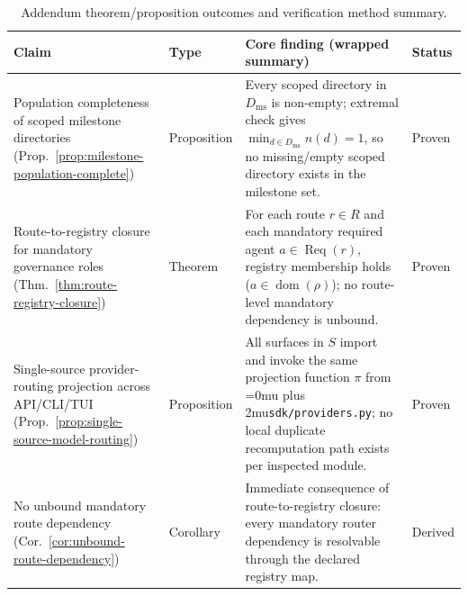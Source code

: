 \documentclass[12pt]{article}
\theoremstyle{definition}
\DeclareRobustCommand{\code}[1]{\begingroup\Urlmuskip=0mu plus 2mu\relax\nolinkurl{#1}\endgroup}
\begin{document}
\begin{table}[H]
\centering
\caption{Addendum theorem/proposition outcomes and verification method summary.}
\label{tab:addendum-results-summary}
\begin{tabularx}{\linewidth}{@{}>{\RaggedRight\arraybackslash}p{3.8cm}>{\RaggedRight\arraybackslash}p{2.8cm}>{\RaggedRight\arraybackslash}X>{\RaggedRight\arraybackslash}p{2.0cm}@{}}
\toprule
\textbf{Claim} & \textbf{Type} & \textbf{Core finding (wrapped summary)} & \textbf{Status} \\
\midrule
Population completeness of scoped milestone directories (Prop.~\ref{prop:milestone-population-complete})
& Proposition
& Every scoped directory in $D_{\mathrm{ms}}$ is non-empty; extremal check gives $\min_{d\in D_{\mathrm{ms}}} n(d)=1$, so no missing/empty scoped directory exists in the milestone set.
& Proven \\
Route-to-registry closure for mandatory governance roles (Thm.~\ref{thm:route-registry-closure})
& Theorem
& For each route $r\in R$ and each mandatory required agent $a\in\operatorname{Req}(r)$, registry membership holds ($a\in\operatorname{dom}(\rho)$); no route-level mandatory dependency is unbound.
& Proven \\
Single-source provider-routing projection across API/CLI/TUI (Prop.~\ref{prop:single-source-model-routing})
& Proposition
& All surfaces in $S$ import and invoke the same projection function $\pi$ from \code{sdk/providers.py}; no local duplicate recomputation path exists per inspected module.
& Proven \\
No unbound mandatory route dependency (Cor.~\ref{cor:unbound-route-dependency})
& Corollary
& Immediate consequence of route-to-registry closure: every mandatory router dependency is resolvable through the declared registry map.
& Derived \\
\bottomrule
\end{tabularx}
\end{table}
\end{document}
